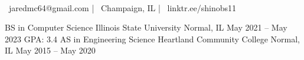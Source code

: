 \documentclass[]{awesome-cv}
\begin{document}

\begin{center}
	  \\ 
	\vspace{2mm}
	{\faEnvelope\ jaredmc64@gmail.com} | {\faMapMarker\ Champaign, IL} | {\faLink\ linktr.ee/shinobs11}
\end{center}
\begin{cventries}
	\cventry
	{BS in Computer Science}
	{Illinois State University}
	{Normal, IL}
	{May 2021 – May 2023}
	{GPA: 3.4}
	\cventry
	{AS in Engineering Science}
	{Heartland Community College}
	{Normal, IL}
	{May 2015 – May 2020}
	{}
\end{cventries}
\end{document}
